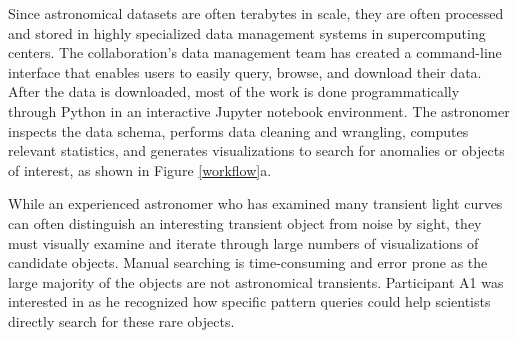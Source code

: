  Since astronomical datasets are often terabytes in scale, they are often processed and stored in highly specialized data management systems in supercomputing centers. The collaboration's data management team has created a command-line interface that enables users to easily query, browse, and download their data. 
After the data is downloaded, most of the work is done programmatically through Python in an interactive Jupyter notebook environment. The astronomer inspects the data schema, performs data cleaning and wrangling, computes relevant statistics, and generates visualizations to search for anomalies or objects of interest, as shown in Figure \ref{workflow}a.
\par While an experienced astronomer who has examined many transient light curves can often distinguish an interesting transient object from noise by sight, they must visually examine and iterate through large numbers of visualizations of candidate objects. Manual searching is time-consuming and error prone as the large majority of the objects are not astronomical transients.
Participant A1 was interested in \zv as he recognized how specific pattern queries could help scientists directly search for these rare objects. 

